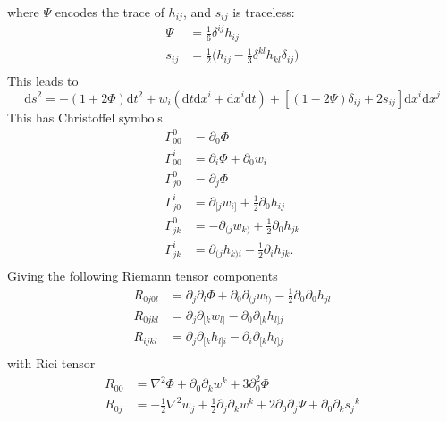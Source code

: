 \documentclass[10pt,landscape,a4paper]{article}
\newcommand{\intgr} {\mathrm{d}}
\begin{document}
\begin{multicols}{3}
\begin{equation}
\begin{split}
\end{split}
\end{equation}
where $\Psi$ encodes the trace of $h_{ij}$, and $s_{ij}$ is traceless:
\begin{equation}
\begin{split}
\Psi &= \frac{1}{6}\delta^{ij} h_{ij} \\
s_{ij} &= \frac{1}{2}\bigg(h_{ij} - \frac{1}{3}\delta^{kl} h_{kl} \delta_{ij}\bigg) \\
\end{split}
\end{equation}
This leads to 
\begin{equation}
\intgr s^2 = -(1+2\Phi)\intgr t^2 + w_i(\intgr t\intgr x^i +\intgr x^i\intgr t) + [(1-2\Psi)\delta_{ij} + 2s_{ij}]\intgr x^i\intgr x^j
\end{equation}
This has Christoffel symbols
\begin{equation}
\begin{split}
\Gamma^0_{00} &=\partial_0\Phi\\
\Gamma^i_{00} &=\partial_i\Phi +\partial_0 w_i\\
\Gamma^0_{j0} &=\partial_j\Phi\\
\Gamma^i_{j0} &=\partial_{[j}w_{i]} +\frac{1}{2}\partial_0h_{ij}\\
\Gamma^0_{jk} &=-\partial_{(j}w_{k)} +\frac{1}{2}\partial_0h_{jk}\\
\Gamma^i_{jk} &=\partial_{(j}h_{k)i} -\frac{1}{2}\partial_ih_{jk}.\\
\end{split}
\end{equation}
Giving the following Riemann tensor components
\begin{equation}
\begin{split}
R_{0j0l} &= \partial_j\partial_l\Phi +\partial_0\partial_{(j}w_{l)} -\frac{1}{2}\partial_0\partial_0 h_{jl}\\
R_{0jkl} &= \partial_j\partial_{[k}w_{l]} -\partial_0\partial_{[k}h_{l]j}\\
R_{ijkl} &= \partial_j\partial_{[k} h_{l]i} -\partial_i\partial_{[k}h_{l]j}\\
\end{split}
\end{equation}
with Rici tensor
\begin{equation}
\begin{split}
R_{00} &= \nabla^2\Phi +\partial_0\partial_kw^k +3\partial_0^2\Phi \\
R_{0j} &= -\frac{1}{2}\nabla^2w_j +\frac{1}{2}\partial_j\partial_kw^k +2\partial_0\partial_j\Psi +\partial_0\partial_ks_j{}^k  \\

\end{split}
\end{equation}
\end{multicols}
\end{document}
